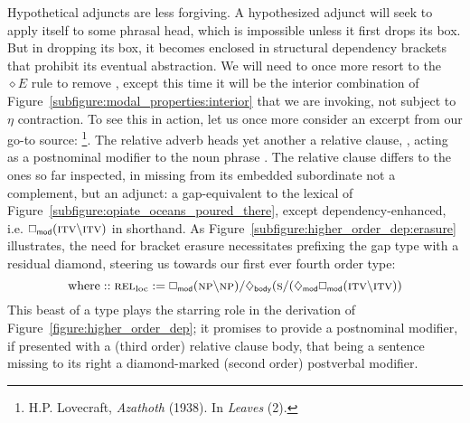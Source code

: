 Hypothetical adjuncts are less forgiving.
A hypothesized adjunct will seek to apply itself to some phrasal head, which is impossible unless it first drops its box.
But in dropping its box, it becomes enclosed in structural dependency brackets that prohibit its eventual abstraction.
We will need to once more resort to the $\diamond E$ rule to remove , except this time it will be the interior combination of Figure~\ref{subfigure:modal_properties:interior} that we are invoking, not subject to $\eta$ contraction.
To see this in action, let us once more consider an excerpt from our go-to source: %
\footnote{H.P. Lovecraft, \textit{Azathoth} (1938). In \textit{Leaves} (2).}.
The relative adverb  heads yet another a relative clause, , acting as a postnominal modifier to the noun phrase .
The relative clause differs to the ones so far inspected, in missing from its embedded subordinate  not a complement, but an adjunct: a gap-equivalent to the lexical  of Figure~\ref{subfigure:opiate_oceans_poured_there}, except dependency-enhanced, i.e. $\dbox{mod}(\smallgtype{itv}\divleft\smallgtype{itv})$ in shorthand.
As Figure~\ref{subfigure:higher_order_dep:erasure} illustrates, the need for bracket erasure necessitates prefixing the gap type with a residual diamond, steering us towards our first ever fourth order type:
\begin{equation}
\text{where} :: \subcat{l}{rel}{loc} := \dbox{mod}(\np\divleft\np)\divright\ddia{body}(\s\divright(\ddia{mod}\dbox{mod}(\smallgtype{itv}\divleft\smallgtype{itv}))
\end{equation} 
This beast of a type plays the starring role in the derivation of Figure~\ref{figure:higher_order_dep}; it promises to provide a postnominal modifier, if presented with a (third order) relative clause body, that being a sentence missing to its right a diamond-marked (second order) postverbal modifier.

